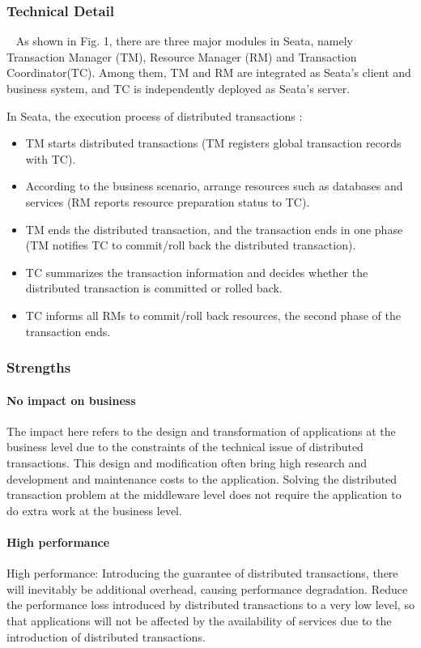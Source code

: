 \documentclass[conference]{IEEEtran}
\begin{document}
\subsubsection{Technical Detail}
\ 
\newline
\indent 
As shown in Fig. 1, there are three major modules in Seata, namely Transaction Manager (TM), Resource Manager (RM) and Transaction Coordinator(TC). Among them, TM and RM are integrated as Seata's client and business system, and TC is independently deployed as Seata's server.



In Seata, the execution process of distributed transactions \cite{b12}:

\begin{itemize}
\item TM starts distributed transactions (TM registers global transaction records with TC).
\item According to the business scenario, arrange resources such as databases and services (RM reports resource preparation status to TC).
\item TM ends the distributed transaction, and the transaction ends in one phase (TM notifies TC to commit/roll back the distributed transaction).
\item TC summarizes the transaction information and decides whether the distributed transaction is committed or rolled back.
\item TC informs all RMs to commit/roll back resources, the second phase of the transaction ends.
\end{itemize}


\subsubsection{Strengths}
\paragraph{No impact on business}
The impact here refers to the design and transformation of applications at the business level due to the constraints of the technical issue of distributed transactions. This design and modification often bring high research and development and maintenance costs to the application. Solving the distributed transaction problem at the middleware level does not require the application to do extra work at the business level.

\paragraph{High performance}
High performance: Introducing the guarantee of distributed transactions, there will inevitably be additional overhead, causing performance degradation. Reduce the performance loss introduced by distributed transactions to a very low level, so that applications will not be affected by the availability of services due to the introduction of distributed transactions.
\end{document}
